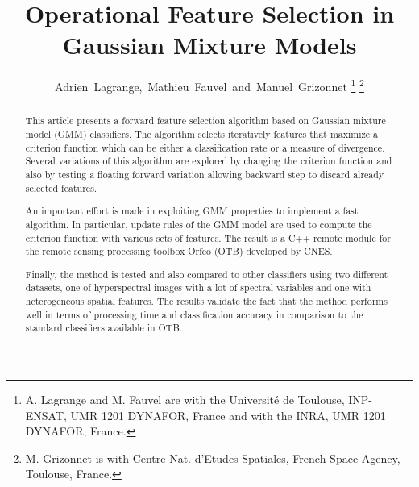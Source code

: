 \documentclass[journal,peerreview,onecolumn]{IEEEtran}
\begin{document}
%
\title{Operational Feature Selection in Gaussian Mixture Models}
%
%
%

\author{Adrien~Lagrange,~Mathieu~Fauvel~and~Manuel~Grizonnet%
\thanks{A. Lagrange and M. Fauvel are with the Université de Toulouse,
INP-ENSAT, UMR 1201 DYNAFOR, France and with the INRA, UMR 1201
DYNAFOR, France.}
\thanks{M. Grizonnet is with Centre Nat. d'Etudes Spatiales, French Space Agency, Toulouse, France.}}


\maketitle

\begin{abstract}
This article presents a forward feature selection algorithm based on Gaussian mixture model (GMM) classifiers. The algorithm selects iteratively features that maximize a criterion function which can be either a classification rate or a measure of divergence. Several variations of this algorithm are explored by changing the criterion function and also by testing a floating forward variation allowing backward step to discard already selected features.

An important effort is made in exploiting GMM properties to implement a fast algorithm. In particular, update rules of the GMM model are used to compute the criterion function with various sets of features. The result is a C++ remote module for the remote sensing processing toolbox Orfeo (OTB) developed by CNES.

Finally, the method is tested and also compared to other classifiers using two different datasets, one of hyperspectral images with a lot of spectral variables and one with heterogeneous spatial features. The results validate the fact that the method performs well in terms of processing time and classification accuracy in comparison to the standard classifiers available in OTB.\\
\end{abstract}
\end{document}
